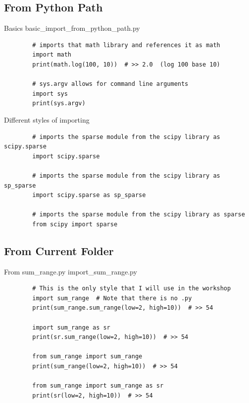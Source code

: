 \documentclass[11pt]{beamer}
\begin{document}
\subsection{From Python Path}
\begin{frame}[fragile]{Basics}
	basic\_import\_from\_python\_path.py
	\begin{lstlisting}
		# imports that math library and references it as math
		import math
		print(math.log(100, 10))  # >> 2.0  (log 100 base 10)

		# sys.argv allows for command line arguments
		import sys
		print(sys.argv)
	\end{lstlisting}
\end{frame}

\begin{frame}[fragile]{Different styles of importing}
	\begin{lstlisting}
		# imports the sparse module from the scipy library as scipy.sparse
		import scipy.sparse

		# imports the sparse module from the scipy library as sp_sparse
		import scipy.sparse as sp_sparse

		# imports the sparse module from the scipy library as sparse
		from scipy import sparse
	\end{lstlisting}
\end{frame}

\subsection{From Current Folder}
\begin{frame}[fragile]{From sum\_range.py}
	import\_sum\_range.py
	\begin{lstlisting}
		# This is the only style that I will use in the workshop
		import sum_range  # Note that there is no .py
		print(sum_range.sum_range(low=2, high=10))  # >> 54

		import sum_range as sr
		print(sr.sum_range(low=2, high=10))  # >> 54

		from sum_range import sum_range
		print(sum_range(low=2, high=10))  # >> 54

		from sum_range import sum_range as sr
		print(sr(low=2, high=10))  # >> 54
	\end{lstlisting}
\end{frame}
\end{document}
